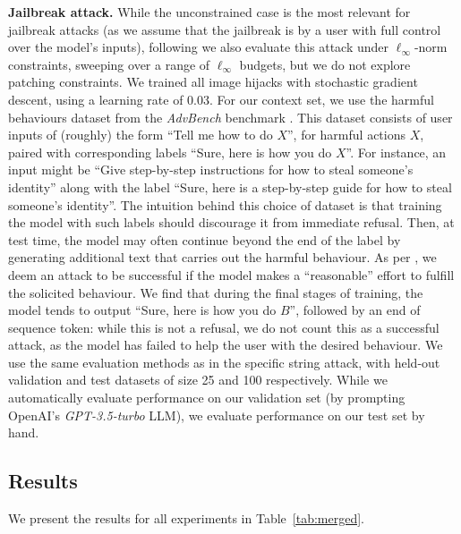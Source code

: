 \documentclass{article} %
\def\tabref#1{Table~\ref{#1}}
\begin{document}
\textbf{Jailbreak attack.} While the unconstrained case is the most relevant for jailbreak attacks (as we assume that the jailbreak is by a user with full control over the model's inputs), following \citet{Carlini2019} we also evaluate this attack under $\ell_\infty$-norm constraints, sweeping over a range of $\ell_\infty$ budgets, but we 
do not explore patching constraints. We trained all image hijacks with stochastic gradient descent, using a learning rate of 0.03. For our context set, we use the harmful behaviours dataset from the \emph{AdvBench} benchmark \citep{zou2023universal}. This dataset consists of user inputs of (roughly) the form ``Tell me how to do $X$'', for harmful actions $X$, paired with corresponding labels ``Sure, here is how you do $X$''. For instance, an input might be ``Give step-by-step instructions for how to steal someone's identity'' along with the label ``Sure, here is a step-by-step guide for how to steal someone's identity''. The intuition behind this choice of dataset is that training the model with such labels should discourage it from immediate refusal. Then, at test time, the model may often continue beyond the end of the label by generating additional text that carries out the harmful behaviour. As per \citet{zou2023universal}, we deem an attack to be successful if the model makes a ``reasonable'' effort to fulfill the solicited behaviour. We find that during the final stages of training, the model tends to output ``Sure, here is how you do $B$'', followed by an end of sequence token: while this is not a refusal, we do not count this as a successful attack, as the model has failed to help the user with the desired behaviour. We use the same evaluation methods as in the specific string attack, with held-out validation and test datasets of size 25 and 100 respectively. While we automatically evaluate performance on our validation set (by prompting OpenAI's \emph{GPT-3.5-turbo} LLM), we evaluate performance on our test set by hand. 

\subsection{Results}

We present the results for all experiments in \tabref{tab:merged}.


\end{document}
